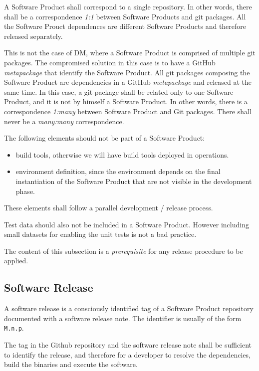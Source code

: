 A Software Product shall correspond to a single repository. 
In other  words, there shall be a correspondence \textit{1:1} between Software Products and git packages.
All the Software Prouct dependences are different Software Products and therefore released separately.

This is not the case of DM, where a Software Product is comprised of multiple git packages.
The compromised solution in this case is to have a GitHub \textit{metapackage} that identify the Software Product.
All git packages composing the Software Product are dependencies in a GitHub \textit{metapackage} and released at the same time.
In this case, a git package shall be related only to one Software Product, and it is not by himself a Software Product.
In other words, there is a correspondence \textit{1:many} between Software Product and Git packages. 
There shall never be a \textit{many:many} correspondence.

The following elements should not be part of a Software Product:

\begin{itemize}
\item build tools, otherwise we will have build tools deployed in operations.
\item environment definition, since the environment depends on the final instantiation of the Software Product that are not visible in the development phase.
\end{itemize}

These elements shall follow a parallel development / release process.

Test data should also not be included in a Software Product. However including small datasets for enabling the unit tests is not a bad practice.

The content of this subsection is a \textit{prerequisite} for any release procedure to be applied.


\subsection{Software Release} \label{sec:defrelease}

A software release is a consciously identified tag of a Software Product repository documented with a software release note.
The identifier is usually of the form \texttt{M.n.p}.

The tag in the Github repository and the software release note shall be sufficient to identify the release, and therefore for a developer
to resolve the dependencies, build the binaries and execute the software.

